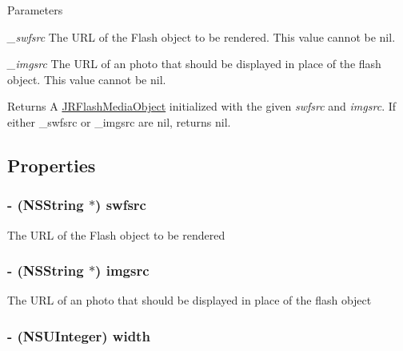 \begin{DoxyParams}{Parameters}
\item[{\em \_\-swfsrc}]The URL of the Flash object to be rendered. This value cannot be {\ttfamily nil}.\item[{\em \_\-imgsrc}]The URL of an photo that should be displayed in place of the flash object. This value cannot be {\ttfamily nil}.\end{DoxyParams}
\begin{DoxyReturn}{Returns}
A {\ttfamily \hyperlink{interface_j_r_flash_media_object}{JRFlashMediaObject}} initialized with the given {\itshape swfsrc\/} and {\itshape imgsrc\/}. If either {\ttfamily \_\-swfsrc} or {\ttfamily \_\-imgsrc} are nil, returns {\ttfamily nil}. 
\end{DoxyReturn}


\subsection{Properties}
\hypertarget{interface_j_r_flash_media_object_a5a79b3d8071ac0286b3ee60e9e0138d0}{
\subsubsection[{swfsrc}]{\setlength{\rightskip}{0pt plus 5cm}-\/ (NSString $\ast$) swfsrc}}
\label{interface_j_r_flash_media_object_a5a79b3d8071ac0286b3ee60e9e0138d0}
The URL of the Flash object to be rendered \hypertarget{interface_j_r_flash_media_object_a5a26cacd216012b37900445a8161ac56}{
\subsubsection[{imgsrc}]{\setlength{\rightskip}{0pt plus 5cm}-\/ (NSString $\ast$) imgsrc}}
\label{interface_j_r_flash_media_object_a5a26cacd216012b37900445a8161ac56}
The URL of an photo that should be displayed in place of the flash object \hypertarget{interface_j_r_flash_media_object_aaeb77e697438b7aa6e44f52bea0ed9c2}{
\subsubsection[{width}]{\setlength{\rightskip}{0pt plus 5cm}-\/ (NSUInteger) width}}
